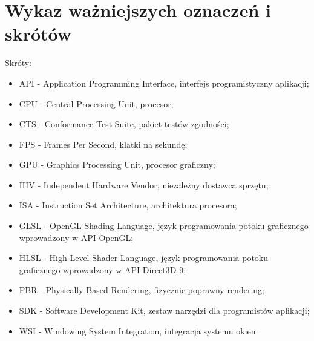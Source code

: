 \chapter*{Wykaz ważniejszych oznaczeń i skrótów}

Skróty:
\begin{itemize}
\item{API} - Application Programming Interface, interfejs programistyczny aplikacji;
\item{CPU} - Central Processing Unit, procesor;
\item{CTS} - Conformance Test Suite, pakiet testów zgodności;
\item{FPS} - Frames Per Second, klatki na sekundę;
\item{GPU} - Graphics Processing Unit, procesor graficzny;
\item{IHV} - Independent Hardware Vendor, niezależny dostawca sprzętu;
\item{ISA} - Instruction Set Architecture, architektura procesora;
\item{GLSL} - OpenGL Shading Language, język programowania potoku graficznego wprowadzony w API OpenGL;
\item{HLSL} - High-Level Shader Language, język programowania potoku graficznego wprowadzony w API Direct3D 9;
\item{PBR} - Physically Based Rendering, fizycznie poprawny rendering;
\item{SDK} - Software Development Kit, zestaw narzędzi dla programistów aplikacji;
\item{WSI} -  Windowing System Integration, integracja systemu okien.
\end{itemize}